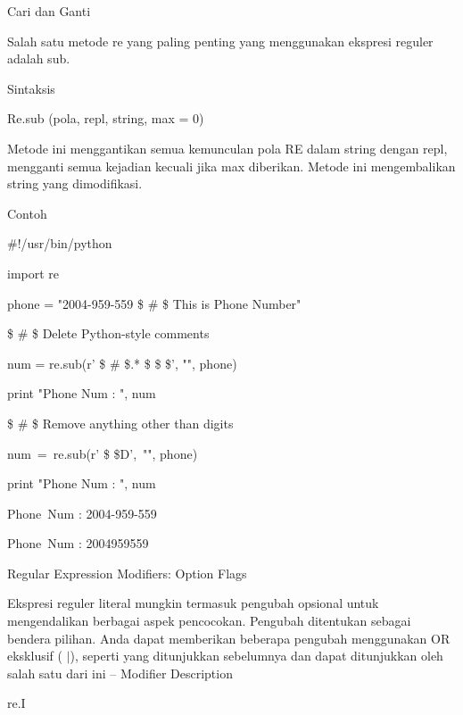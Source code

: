 \noindent 
Cari dan Ganti \par
\vspace{12pt}
\noindent 
Salah satu metode re yang paling penting yang menggunakan ekspresi reguler adalah sub. \par
\noindent 
Sintaksis \par
\vspace{12pt}
Re.sub (pola, repl, string, max = 0) \par
\vspace{12pt}
\noindent 
Metode ini menggantikan semua kemunculan pola RE dalam string dengan repl, mengganti semua kejadian kecuali jika max diberikan. Metode ini mengembalikan string yang dimodifikasi. \par
Contoh \par
\noindent 
 $  \#  $!/usr/bin/python \par
\noindent 
import re \par
\vspace{12pt}
\noindent 
phone = "2004-959-559  \$  \#  \$ This is Phone Number" \par
\vspace{12pt}
\noindent 
 \$  \#  \$ Delete Python-style comments \par
\noindent 
num = re.sub(r' \$  \#  \$.* \$  \$  \$', "", phone) \par
\noindent 
print "Phone Num : ", num \par
\vspace{12pt}
\noindent 
 \$  \#  \$ Remove anything other than digits \par
\noindent 
num~=~re.sub(r' \$  \setminus  \$D',~"", phone)     \par
\noindent 
print "Phone Num : ", num \par
\vspace{12pt}
\noindent 
Phone~Num :  2004-959-559 \par
\noindent 
Phone~Num :  2004959559 \par
\vspace{12pt}
\noindent 
Regular Expression Modifiers: Option Flags \par
Ekspresi reguler literal mungkin termasuk pengubah opsional untuk mengendalikan berbagai aspek pencocokan. Pengubah ditentukan sebagai bendera pilihan. Anda dapat memberikan beberapa pengubah menggunakan OR eksklusif ( $  \vert  $), seperti yang ditunjukkan sebelumnya dan dapat ditunjukkan oleh salah satu dari ini – Modifier Description  \par
\noindent 
re.I \hspace*{0.5in}  \par
